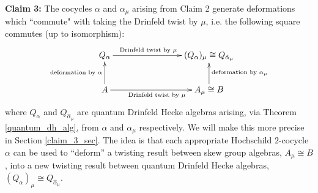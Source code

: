 \documentclass[10pt]{article}
\newcommand{\bb}{\medbreak}
\newcommand{\nt}{\noindent}
\newcommand{\definex}[1]{\textbf{#1}}
\theoremstyle{definition}
\begin{document}


\nt \definex{Claim 3:} The cocycles $\alpha$ and $\alpha_\mu$ arising from Claim 2 generate deformations which ``commute" with taking the Drinfeld twist by $\mu$, i.e. the following square commutes (up to isomorphism):
$$\xymatrix@C=8em{
Q_\alpha \ar[r]^{\text{Drinfeld twist by }\mu\qquad} & (Q_\alpha)_\mu\cong Q_{\hat{\alpha}_\mu}\\
A \ar[u]^{\text{deformation by }\alpha} \ar[r]_{\text{Drinfeld twist by }\mu} & A_\mu \cong B \ar[u]_{\text{deformation by }\alpha_\mu}
}$$
where $Q_\alpha$ and $Q_{\hat{\alpha}_\mu}$ are quantum Drinfeld Hecke algebras arising, via Theorem \ref{quantum_dh_alg}, from $\alpha$ and $\alpha_\mu$ respectively. We will make this more precise in Section \ref{claim_3_sec}. The idea is that each appropriate Hochschild $2$-cocycle $\alpha$ can be used to ``deform'' a twisting result between skew group algebras, $A_\mu\cong B$, into a new twisting result between quantum Drinfeld Hecke algebras, $ (Q_\alpha)_\mu\cong Q_{\hat{\alpha}_\mu}$.\bb %


\end{document}
